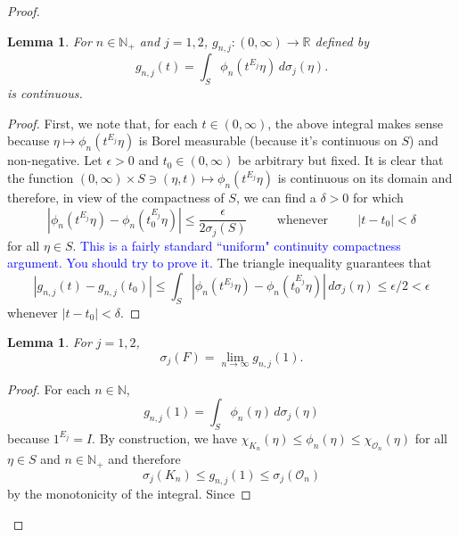 \documentclass[11pt]{article}
\theoremstyle{theorem}
\newtheorem{lemma}[theorem]{Lemma}
\newcommand*{\myproofname}{Proof}
\newenvironment{subproof}[1][\myproofname]{\begin{proof}[#1]\renewcommand*{\qedsymbol}{$\mathbin{/\mkern-6mu/}$}}{\end{proof}}
\begin{document}
\begin{proof}
\begin{lemma}
For $n\in\mathbb{N}_+$ and $j=1,2$, $g_{n,j}:(0,\infty)\to\mathbb{R}$ defined by
\begin{equation*}
g_{n,j}(t)=\int_S\phi_n(t^{E_j}\eta)\,d\sigma_j(\eta).
\end{equation*}
is continuous.
\end{lemma}
\begin{subproof}
First, we note that, for each $t\in (0,\infty)$, the above integral makes sense because $\eta\mapsto \phi_n(t^{E_j}\eta)$ is Borel measurable (because it's continuous on $S$) and non-negative. Let $\epsilon>0$ and $t_0\in (0,\infty)$ be arbitrary but fixed. It is clear that the function $(0,\infty)\times S\ni (\eta,t)\mapsto \phi_n(t^{E_j}\eta)$ is continuous on its domain and therefore, in view of the compactness of $S$, we can find a $\delta>0$ for which
\begin{equation*}
|\phi_n(t^{E_j}\eta)-\phi_n(t_0^{E_j}\eta)|\leq\frac{\epsilon}{2\sigma_j(S)}\hspace{1cm}\mbox{whenever}\hspace{1cm}|t-t_0|<\delta
\end{equation*}
for all $\eta\in S$. \textcolor{blue}{This is a fairly standard ``uniform" continuity compactness argument. You should try to prove it.} The triangle inequality guarantees that
\begin{equation*}
|g_{n,j}(t)-g_{n,j}(t_0)|\leq \int_S|\phi_n(t^{E_j}\eta)-\phi_n(t_0^{E_j}\eta)|\,d\sigma_j(\eta)\leq\epsilon/2<\epsilon
\end{equation*}
whenever $|t-t_0|<\delta$.
\end{subproof}
\begin{lemma}
For $j=1,2$,
\begin{equation*}
\sigma_j(F)=\lim_{n\to\infty}g_{n,j}(1).
\end{equation*}
\end{lemma}
\begin{subproof}
For each $n\in\mathbb{N}$,
\begin{equation*}
g_{n,j}(1)=\int_{S}\phi_n(\eta)\,d\sigma_j(\eta)
\end{equation*}
because $1^{E_j}=I$. By construction, we have $\chi_{K_n}(\eta)\leq\phi_{n}(\eta)\leq \chi_{\mathcal{O}_n}(\eta)$ for all $\eta\in S$ and $n\in\mathbb{N}_+$ and therefore
\begin{equation*}
\sigma_j(K_n)\leq g_{n,j}(1)\leq \sigma_{j}(\mathcal{O}_n)
\end{equation*}
by the monotonicity of the integral. Since

\end{subproof}
\end{proof}
\end{document}
